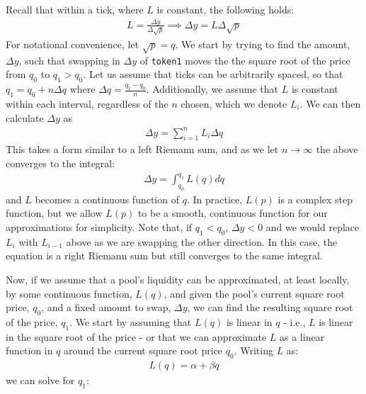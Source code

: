 \documentclass[11pt]{article}
\begin{document}
Recall that within a tick, where $L$ is constant, the following holds:
\begin{gather*}
    L = \frac{\Delta y}{\Delta \sqrt{p}} \implies \Delta y = L \Delta \sqrt{p}
\end{gather*}
For notational convenience, let $\sqrt{p} = q$. We start by trying to find the amount, $\Delta y$, such that swapping in $\Delta y$ of \texttt{token1} moves the the square root of the price from $q_0$ to $q_1 > q_0$. Let us assume that ticks can be arbitrarily spaced, so that $q_1 = q_0 + n \Delta q$ where $\Delta q = \frac{q_1 - q_0}{n}$. Additionally, we assume that $L$ is constant within each interval, regardless of the $n$ chosen, which we denote $L_i$. We can then calculate $\Delta y$ as
\begin{gather*}
    \Delta y = \sum_{i=1}^{n} L_i \Delta q
\end{gather*}
This takes a form similar to a left Riemann sum, and as we let $n \rightarrow \infty$ the above converges to the integral:
\begin{gather}
    \Delta y = \int_{q_0}^{q_1} L(q) dq
\end{gather}
and $L$ becomes a continuous function of $q$. In practice, $L(p)$ is a complex step function, but we allow $L(p)$ to be a smooth, continuous function for our approximations for simplicity. Note that, if $q_1 < q_0$, $\Delta y < 0$ and we would replace $L_i$ with $L_{i-1}$ above as we are swapping the other direction. In this case, the equation is a right Riemann sum but still converges to the same integral.

Now, if we assume that a pool's liquidity can be approximated, at least locally, by some continuous function, $L(q)$, and given the pool's current square root price, $q_0$, and a fixed amount to swap, $\Delta y$, we can find the resulting square root of the price, $q_1$. We start by assuming that $L(q)$ is linear in $q$ - i.e., $L$ is linear in the square root of the price - or that we can approximate $L$ as a linear function in $q$ around the current square root price $q_0$. Writing $L$ as:
\begin{gather*}
    L(q) = \alpha + \beta q
\end{gather*}
we can solve for $q_1$:
\end{document}
